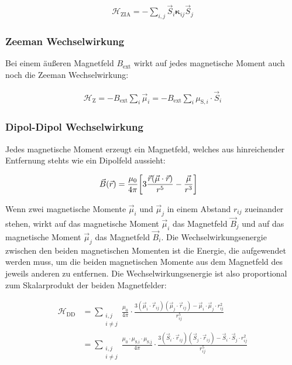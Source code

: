 \documentclass[main.tex]{subfiles}
\begin{document}

\begin{align}
	\mathcal{H}_{\text{ZIA}} = -\sum_{i,j} \vec{S}_i \mathbf{\kappa}_{ij}
	\vec{S}_j
\end{align}
\subsubsection*{Zeeman Wechselwirkung}
Bei einem äußeren Magnetfeld \(B_\text{ext}\) wirkt auf jedes magnetische
Moment auch noch die Zeeman Wechselwirkung:

\begin{align}
	\mathcal{H}_{\text{Z}} = - B_\text{ext} \sum_{i} \vec{\mu}_i = -
	B_\text{ext} \sum_{i} \mu_{\text{S},i} \cdot \vec{S}_i
\end{align}

\subsubsection*{Dipol-Dipol Wechselwirkung}

Jedes magnetische Moment erzeugt ein Magnetfeld, welches aus hinreichender
Entfernung stehts wie ein Dipolfeld aussieht:

\begin{align}
	\vec{B}(\vec{r}) & = \frac{\mu_0}{4\pi} \qty[3 \frac{\vec{r}(\vec{\mu}
			\cdot
			\vec{r})}{r^5} -
		\frac{\vec{\mu}}{r^3}]\label{eq:dipolmoment}
\end{align}\cite{Nolting-3-elektrodynamik}

Wenn zwei magnetische Momente \(\vec{\mu}_i\) und \(\vec{\mu}_j\) in einem
Abstand \(r_{ij}\) zueinander stehen, wirkt auf das magnetische Moment
\(\vec{\mu}_i\) das Magnetfeld \(\vec{B}_j\) und auf das magnetische Moment
\(\vec{\mu}_j\) das Magnetfeld \(\vec{B}_i\). Die Wechselwirkungsenergie
zwischen den beiden magnetischen Momenten ist die Energie, die aufgewendet
werden muss, um die beiden magnetischen Momente aus dem Magnetfeld des jeweils
anderen zu entfernen. Die Wechselwirkungsenergie ist also proportional zum
Skalarprodukt der beiden Magnetfelder:

\begin{align}
	\mathcal{H}_{\text{DD}} & = \sum_{\substack{i,j           \\ i \neq j}}
	\frac{\mu_0}{4\pi}
	\cdot  \frac{3(\vec{\mu}_i \cdot \vec{r}_{ij})(\vec{\mu}_j \cdot
		\vec{r}_{ij})
	- \vec{\mu}_i \cdot \vec{\mu}_j \cdot r_{ij}^2}{r_{ij}^5} \\
	                        & = \sum_{\substack{i,j           \\ i \neq j}}
	\frac{\mu_0 \cdot \mu_{\text{S,i}} \cdot \mu_{\text{S,j}}}{4\pi}
	\cdot \frac{3(\vec{S}_i \cdot \vec{r}_{ij})(\vec{S}_j \cdot
		\vec{r}_{ij})
		- \vec{S}_i \cdot \vec{S}_j \cdot r_{ij}^2}{r_{ij}^5}
\end{align}
\end{document}
